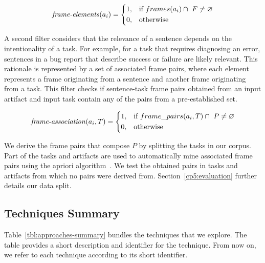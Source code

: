 \begin{equation}
\text{\textit{frame-elements}}(a_i) = \left \{
\begin{aligned}
    &1, && \text{if}\ frames(a_i) \cap ~F \ne \emptyset \\
    &0, && \text{otherwise}
\end{aligned} \right.
\end{equation} 


\medskip
A second filter considers that the relevance of a sentence depends on the intentionality of a task. 
For example, for a task that requires diagnosing an error, sentences in a bug report that describe success or failure are likely relevant. 
This rationale is represented by a set of associated frame pairs, where each element represents a frame originating from a sentence and another frame originating from a task.
This filter checks if sentence-task frame pairs obtained from an input artifact and input task contain any of the pairs from a pre-established set.




\begin{equation}
\text{\textit{frame-association}}(a_i, T) = \left \{
\begin{aligned}
    &1, && \text{if}\ frame\_pairs(a_i, T) \cap ~P \ne \emptyset \\
    &0, && \text{otherwise}
\end{aligned} \right.
\end{equation} 

\smallskip
We derive the frame pairs that compose $P$ by splitting the tasks in our corpus. Part of the tasks and artifacts are used to automatically
mine associated frame pairs using the apriori algorithm~\cite{agrawal1994apriori}. We test the obtained pairs in tasks and artifacts from which no pairs were derived from. 
Section~\ref{cp5:evaluation} further details our data split.









\subsection{Techniques Summary}


Table~\ref{tbl:approaches-summary} bundles the techniques that we explore.
The table provides a short description and identifier for the technique. From now on, we refer to each technique according to its short identifier.


